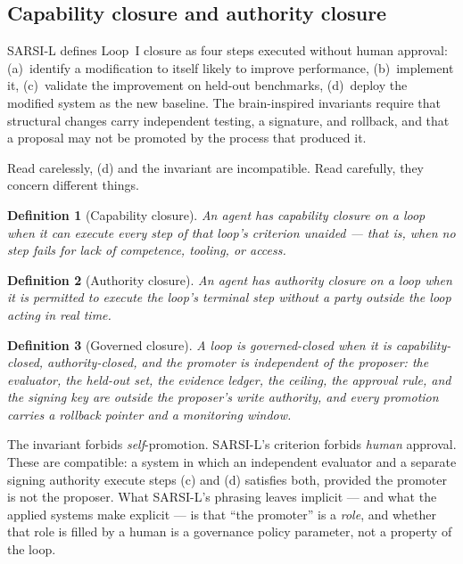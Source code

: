 \documentclass[11pt]{article}
\newtheorem{definition}{Definition}
\begin{document}
\subsection{Capability closure and authority closure}
SARSI-L defines Loop~I closure as four steps executed without human approval: (a)~identify a modification to itself likely to improve performance, (b)~implement it, (c)~validate the improvement on held-out benchmarks, (d)~deploy the modified system as the new baseline. The brain-inspired invariants require that structural changes carry independent testing, a signature, and rollback, and that a proposal may not be promoted by the process that produced it.

Read carelessly, (d) and the invariant are incompatible. Read carefully, they concern different things.

\begin{definition}[Capability closure]
An agent has \emph{capability closure} on a loop when it can execute every step of that loop's criterion unaided --- that is, when no step fails for lack of competence, tooling, or access.
\end{definition}

\begin{definition}[Authority closure]
An agent has \emph{authority closure} on a loop when it is \emph{permitted} to execute the loop's terminal step without a party outside the loop acting in real time.
\end{definition}

\begin{definition}[Governed closure]
A loop is \emph{governed-closed} when it is capability-closed, authority-closed, and the promoter is independent of the proposer: the evaluator, the held-out set, the evidence ledger, the ceiling, the approval rule, and the signing key are outside the proposer's write authority, and every promotion carries a rollback pointer and a monitoring window.
\end{definition}

The invariant forbids \emph{self}-promotion. SARSI-L's criterion forbids \emph{human} approval. These are compatible: a system in which an independent evaluator and a separate signing authority execute steps (c) and (d) satisfies both, provided the promoter is not the proposer. What SARSI-L's phrasing leaves implicit --- and what the applied systems make explicit --- is that ``the promoter'' is a \emph{role}, and whether that role is filled by a human is a governance policy parameter, not a property of the loop.
\end{document}
